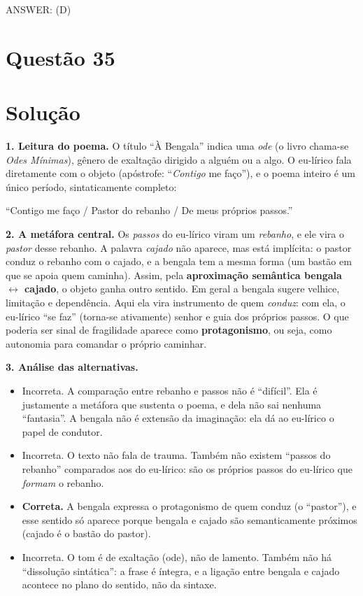 \documentclass{article}%
\begin{document}
ANSWER: (D)%
\newpage%
\section*{Questão 35}

\section*{Solução}

\textbf{1. Leitura do poema.} O título ``À Bengala'' indica uma \emph{ode} (o livro chama-se \emph{Odes Mínimas}), gênero de exaltação dirigido a alguém ou a algo. O eu-lírico fala diretamente com o objeto (apóstrofe: ``\emph{Contigo} me faço''), e o poema inteiro é um único período, sintaticamente completo:
\begin{center}
``Contigo me faço / Pastor do rebanho / De meus próprios passos.''
\end{center}

\textbf{2. A metáfora central.} Os \emph{passos} do eu-lírico viram um \emph{rebanho}, e ele vira o \emph{pastor} desse rebanho. A palavra \emph{cajado} não aparece, mas está implícita: o pastor conduz o rebanho com o cajado, e a bengala tem a mesma forma (um bastão em que se apoia quem caminha). Assim, pela \textbf{aproximação semântica bengala $\leftrightarrow$ cajado}, o objeto ganha outro sentido. Em geral a bengala sugere velhice, limitação e dependência. Aqui ela vira instrumento de quem \emph{conduz}: com ela, o eu-lírico ``se faz'' (torna-se ativamente) senhor e guia dos próprios passos. O que poderia ser sinal de fragilidade aparece como \textbf{protagonismo}, ou seja, como autonomia para comandar o próprio caminhar.

\textbf{3. Análise das alternativas.}
\begin{itemize}
\item[a)] Incorreta. A comparação entre rebanho e passos não é ``difícil''. Ela é justamente a metáfora que sustenta o poema, e dela não sai nenhuma ``fantasia''. A bengala não é extensão da imaginação: ela dá ao eu-lírico o papel de condutor.
\item[b)] Incorreta. O texto não fala de trauma. Também não existem ``passos do rebanho'' comparados aos do eu-lírico: são os próprios passos do eu-lírico que \emph{formam} o rebanho.
\item[c)] \textbf{Correta.} A bengala expressa o protagonismo de quem conduz (o ``pastor''), e esse sentido só aparece porque bengala e cajado são semanticamente próximos (cajado é o bastão do pastor).
\item[d)] Incorreta. O tom é de exaltação (ode), não de lamento. Também não há ``dissolução sintática'': a frase é íntegra, e a ligação entre bengala e cajado acontece no plano do sentido, não da sintaxe.
\end{itemize}
\end{document}
